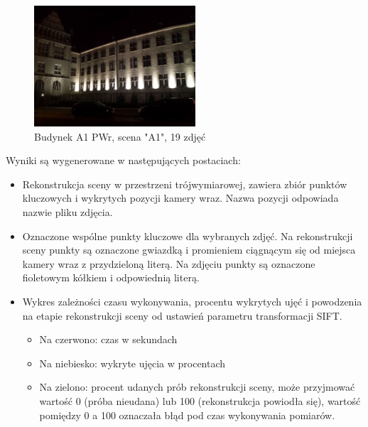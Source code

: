 \begin{figure}[h]
   \centering
   \includegraphics[width=6cm]{img/A1.jpg}
   \caption{Budynek A1 PWr, scena "A1", 19 zdjęć}
   \label {fig:scene_A1}
\end{figure}

Wyniki są wygenerowane w następujących postaciach:
\begin{itemize}
   \item Rekonstrukcja sceny w przestrzeni trójwymiarowej, zawiera zbiór punktów kluczowych i wykrytych pozycji kamery wraz. Nazwa pozycji odpowiada nazwie pliku zdjęcia.
   \item Oznaczone wspólne punkty kluczowe dla wybranych zdjęć. Na rekonstrukcji sceny punkty są oznaczone gwiazdką i promieniem ciągnącym się od miejsca kamery wraz z przydzieloną literą. Na zdjęciu punkty są oznaczone fioletowym kółkiem i odpowiednią literą.
   \item Wykres zależności czasu wykonywania, procentu wykrytych ujęć i powodzenia na etapie rekonstrukcji sceny od ustawień parametru transformacji SIFT.
   \begin{itemize}
      \item  Na czerwono: czas w sekundach
      \item  Na niebiesko: wykryte ujęcia w procentach
      \item  Na zielono: procent udanych prób rekonstrukcji sceny, może przyjmować wartość 0 (próba nieudana) lub 100 (rekonstrukcja powiodła się), wartość pomiędzy 0 a 100 oznaczała błąd pod czas wykonywania pomiarów.
   \end{itemize}
\end{itemize}


